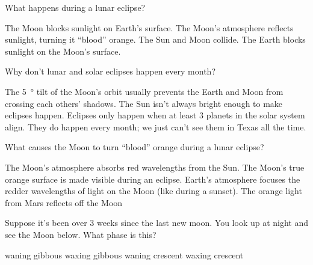 \documentclass[addpoints]{exam}
\begin{document}
\begin{questions}
\question
What happens during a lunar eclipse?

\begin{choices}
    \choice The Moon blocks sunlight on Earth's surface.
    \choice The Moon's atmosphere reflects sunlight, turning it ``blood'' orange.
    \choice The Sun and Moon collide.
    \correctchoice The Earth blocks sunlight on the Moon's surface.
\end{choices}

\question
Why don't lunar and solar eclipses happen every month?

\begin{choices}
    \correctchoice The \SI{5}{\degree} tilt of the Moon's orbit usually prevents the Earth and Moon from crossing each others' shadows.
    \choice The Sun isn't always bright enough to make eclipses happen.
    \choice Eclipses only happen when at least 3 planets in the solar system align.
    \choice They do happen every month; we just can't see them in Texas all the time.
\end{choices}

\question 
What causes the Moon to turn ``blood'' orange during a lunar eclipse?

\begin{choices}
    \choice The Moon's atmosphere absorbs red wavelengths from the Sun.
    \choice The Moon's true orange surface is made visible during an eclipse.
    \correctchoice Earth's atmosphere focuses the redder wavelengths of light on the Moon (like during a sunset).
    \choice The orange light from Mars reflects off the Moon
\end{choices}

\question
Suppose it's been over 3 weeks since the last new moon. You look up at night and see the Moon below. What phase is this?

\begin{minipage}{0.3\textwidth}
    \begin{choices}
        \choice waning gibbous
        \choice waxing gibbous
        \correctchoice waning crescent
        \choice waxing crescent
    \end{choices}
\end{minipage}%
\begin{minipage}{0.3\textwidth}
\end{minipage}


\end{questions}
\end{document}
